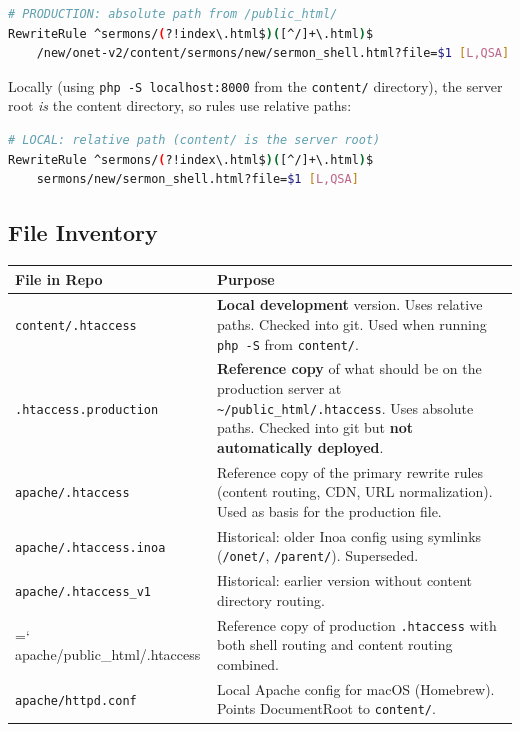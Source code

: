 \documentclass[12pt]{article}
\newcommand{\tpath}[1]{{\small\ttfamily\hyphenchar\font=`\/ #1}}
\begin{document}
\begin{lstlisting}[language=bash,numbers=none]
# PRODUCTION: absolute path from /public_html/
RewriteRule ^sermons/(?!index\.html$)([^/]+\.html)$
    /new/onet-v2/content/sermons/new/sermon_shell.html?file=$1 [L,QSA]
\end{lstlisting}

Locally (using \texttt{php -S localhost:8000} from the \texttt{content/} directory), the server root \emph{is} the content directory, so rules use relative paths:

\begin{lstlisting}[language=bash,numbers=none]
# LOCAL: relative path (content/ is the server root)
RewriteRule ^sermons/(?!index\.html$)([^/]+\.html)$
    sermons/new/sermon_shell.html?file=$1 [L,QSA]
\end{lstlisting}

\subsection{File Inventory}

\begin{longtable}{p{4.8cm}p{8cm}}
\toprule
\textbf{File in Repo} & \textbf{Purpose} \\
\midrule
\texttt{content/.htaccess} & \textbf{Local development} version. Uses relative paths. Checked into git. Used when running \texttt{php -S} from \texttt{content/}. \\
\midrule
\texttt{.htaccess.production} & \textbf{Reference copy} of what should be on the production server at \texttt{\textasciitilde/public\_html/.htaccess}. Uses absolute paths. Checked into git but \textbf{not automatically deployed}. \\
\midrule
\texttt{apache/.htaccess} & Reference copy of the primary rewrite rules (content routing, CDN, URL normalization). Used as basis for the production file. \\
\midrule
\texttt{apache/.htaccess.inoa} & Historical: older Inoa config using symlinks (\texttt{/onet/}, \texttt{/parent/}). Superseded. \\
\midrule
\texttt{apache/.htaccess\_v1} & Historical: earlier version without content directory routing. \\
\midrule
\tpath{apache/public\_html/\allowbreak .htaccess} & Reference copy of production \texttt{.htaccess} with both shell routing and content routing combined. \\
\midrule
\texttt{apache/httpd.conf} & Local Apache config for macOS (Homebrew). Points DocumentRoot to \texttt{content/}. \\
\bottomrule
\end{longtable}
\end{document}
